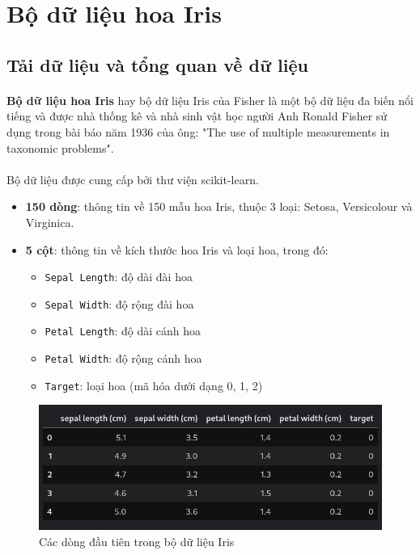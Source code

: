 \newpage
\section{Bộ dữ liệu hoa Iris}

\subsection{Tải dữ liệu và tổng quan về dữ liệu} 
\paragraph{}{\textbf{Bộ dữ liệu hoa Iris} hay bộ dữ liệu Iris của Fisher là một bộ dữ liệu đa biến nổi tiếng và được nhà thống kê và nhà sinh vật học người Anh Ronald Fisher sử dụng trong bài báo năm 1936 của ông: "The use of multiple measurements in taxonomic problems". \cite{fisher1936use}}
\paragraph{}{Bộ dữ liệu được cung cấp bởi thư viện scikit-learn.}
\begin{itemize}
    \item \textbf{150 dòng}: thông tin về 150 mẫu hoa Iris, thuộc 3 loại: Setosa, Versicolour và Virginica.
    \item \textbf{5 cột}: thông tin về kích thước hoa Iris và loại hoa, trong đó:
    \begin{itemize}
        \item \texttt{Sepal Length}: độ dài đài hoa
        \item \texttt{Sepal Width}: độ rộng đài hoa
        \item \texttt{Petal Length}: độ dài cánh hoa
        \item \texttt{Petal Width}: độ rộng cánh hoa
        \item \texttt{Target}: loại hoa (mã hóa dưới dạng 0, 1, 2)
    \end{itemize}
\end{itemize}

\begin{figure}[H]
    \centering
    \includegraphics[width=0.8\linewidth]{img/iris_head.png}
    \caption{Các dòng đầu tiên trong bộ dữ liệu Iris}
    \label{fig:iris_head}
\end{figure}

